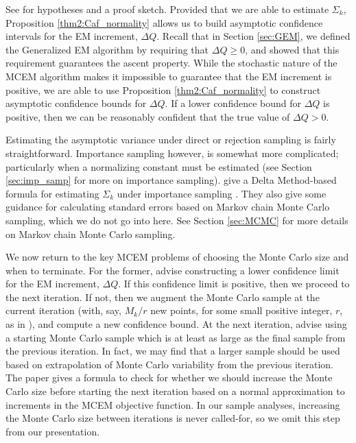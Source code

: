 \documentclass[11pt, oneside]{article}   	%
\begin{document}
See \citeauthor{Caf05} for hypotheses and a proof sketch. Provided that we are able to estimate $\Sigma_k$, Proposition \ref{thm2:Caf_normality} allows us to build asymptotic confidence intervals for the EM increment, $\Delta Q$. Recall that in Section \ref{sec:GEM}, we defined the Generalized EM algorithm by requiring that $\Delta Q \geq 0$, and showed that this requirement guarantees the ascent property. While the stochastic nature of the MCEM algorithm makes it impossible to guarantee that the EM increment is positive, we are able to use Proposition \ref{thm2:Caf_normality} to construct asymptotic confidence bounds for $\Delta Q$. If a lower confidence bound for $\Delta Q$ is positive, then we can be reasonably confident that the true value of $\Delta Q > 0$.

Estimating the asymptotic variance under direct or rejection sampling is fairly straightforward. Importance sampling however, is somewhat more complicated; particularly when a normalizing constant must be estimated (see Section \ref{sec:imp_samp} for more on importance sampling). \citeauthor{Caf05} give a Delta Method-based formula for estimating $\Sigma_k$ under importance sampling \citep[see Chapter 3 of][for an overview of the Delta Method]{van98}. They also give some guidance for calculating standard errors based on Markov chain Monte Carlo sampling, which we do not go into here. See Section \ref{sec:MCMC} for more details on Markov chain Monte Carlo sampling. 

We now return to the key MCEM problems of choosing the Monte Carlo size and when to terminate. For the former, \citeauthor{Caf05} advise constructing a lower confidence limit for the EM increment, $\Delta Q$. If this confidence limit is positive, then we proceed to the next iteration. If not, then we augment the Monte Carlo sample at the current iteration (with, say, $M_k/r$ new points, for some small positive integer, $r$, as in \citealp{Boo99}), and compute a new confidence bound. At the next iteration, \citeauthor{Caf05} advise using a starting Monte Carlo sample which is at least as large as the final sample from the previous iteration. In fact, we may find that a larger sample should be used based on extrapolation of Monte Carlo variability from the previous iteration. The paper gives a formula to check for whether we should increase the Monte Carlo size before starting the next iteration based on a normal approximation to increments in the MCEM objective function. In our sample analyses, increasing the Monte Carlo size between iterations is never called-for, so we omit this step from our presentation.
\end{document}
